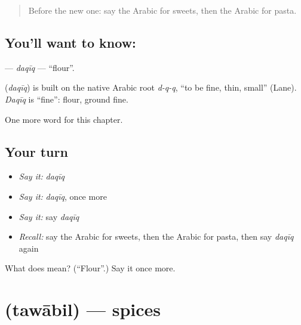 \label{lesson:AR-C273-daqiq}



\begin{quote}
Before the new one: say the Arabic for sweets, then the Arabic for pasta.
\end{quote}

\subsection*{You'll want to know: }
\textbf{} — \emph{daqīq} — \textquotedblleft{}flour\textquotedblright{}.

\begin{cousinweb}
\textbf{} (\emph{daqīq}) is built on the native Arabic root \emph{d-q-q}, \textquotedblleft{}to be fine, thin, small\textquotedblright{} (Lane). \emph{Daqīq} is \textquotedblleft{}fine\textquotedblright{}: flour, ground fine.
\end{cousinweb}

\begin{grammarlens}[title={What you've built}]
One more word for this chapter.
\end{grammarlens}

\subsection*{Your turn}
\begin{itemize}
\raggedright
  \item \emph{Say it:} \emph{daqīq}
  \item \emph{Say it:} \emph{daqīq}, once more
  \item \emph{Say it:} say \emph{daqīq}
  \item \emph{Recall:} say the Arabic for sweets, then the Arabic for pasta, then say \emph{daqīq} again
\end{itemize}

\begin{tcolorbox}[breakable,colback=teal!4,colframe=teal!35!black,title={Before you move on}]
What does  mean? (\textquotedblleft{}Flour\textquotedblright{}.) Say it once more.
\end{tcolorbox}
\section[\texorpdfstring{\ar{توابل} (tawābil)}{توابل (tawābil)}]{ (tawābil) — spices}

\label{lesson:AR-C273-tawabil}



